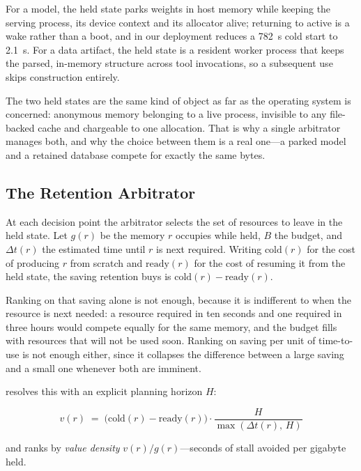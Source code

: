 For a model, the held state parks weights in host memory while keeping the
serving process, its device context and its allocator alive; returning to
active is a wake rather than a boot, and in our deployment reduces a 782~s
cold start to 2.1~s. For a data artifact, the held state is a resident worker
process that keeps the parsed, in-memory structure across tool invocations, so
a subsequent use skips construction entirely.

The two held states are the same kind of object as far as the operating system
is concerned: anonymous memory belonging to a live process, invisible to any
file-backed cache and chargeable to one allocation. That is why a single
arbitrator manages both, and why the choice between them is a real one---a
parked model and a retained database compete for exactly the same bytes.

\subsection{The Retention Arbitrator}

At each decision point the arbitrator selects the set of resources to leave in
the held state. Let $g(r)$ be the memory $r$ occupies while held, $B$ the
budget, and $\Delta t(r)$ the estimated time until $r$ is next required.
Writing $\mathrm{cold}(r)$ for the cost of producing $r$ from scratch and
$\mathrm{ready}(r)$ for the cost of resuming it from the held state, the
saving retention buys is $\mathrm{cold}(r) - \mathrm{ready}(r)$.

Ranking on that saving alone is not enough, because it is indifferent to when
the resource is next needed: a resource required in ten seconds and one
required in three hours would compete equally for the same memory, and the
budget fills with resources that will not be used soon. Ranking on saving per
unit of time-to-use is not enough either, since it collapses the difference
between a large saving and a small one whenever both are imminent.

\sysname resolves this with an explicit planning horizon $H$:

\begin{equation}
v(r) \;=\; \bigl(\mathrm{cold}(r) - \mathrm{ready}(r)\bigr)
           \cdot \frac{H}{\max\!\left(\Delta t(r),\, H\right)}
\label{eq:value}
\end{equation}

\noindent and ranks by \emph{value density} $v(r)/g(r)$---seconds of stall
avoided per gigabyte held.

